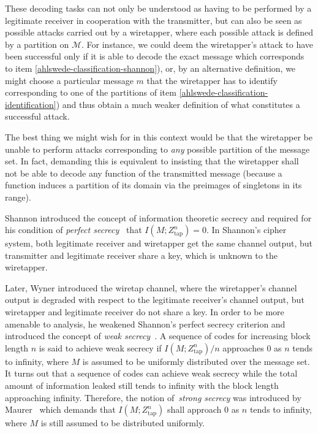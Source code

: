 \documentclass[journal]{IEEEtran}
\newcommand{\channelOut}{Z}
\newcommand{\channelOutWiretapper}{\channelOut_\mathrm{tap}}
\newcommand{\codebookBlocklength}{n}
\newcommand{\mutualInformation}[2]{I(#1;#2)}
\newcommand{\messageRV}{M}
\newcommand{\messageAlphabet}{\mathcal{M}}
\newcommand{\messageAlphabetElement}{m}
\begin{document}
These decoding tasks can not only be understood as having to be performed by a legitimate receiver in cooperation with the transmitter, but can also be seen as possible attacks carried out by a wiretapper, where each possible attack is defined by a partition on $\messageAlphabet$. For instance, we could deem the wiretapper's attack to have been successful only if it is able to decode the exact message which corresponds to item \ref{ahlswede-classification-shannon}), or, by an alternative definition, we might choose a particular message $\messageAlphabetElement$ that the wiretapper has to identify corresponding to one of the partitions of item \ref{ahlswede-classification-identification}) and thus obtain a much weaker definition of what constitutes a successful attack. 

The best thing we might wish for in this context would be that the wiretapper be unable to perform attacks corresponding to \emph{any} possible partition of the message set. In fact, demanding this is equivalent to insisting that the wiretapper shall not be able to decode any function of the transmitted message (because a function induces a partition of its domain via the preimages of singletons in its range).
 
Shannon introduced the concept of information theoretic secrecy and required for his condition of \emph{perfect secrecy}~\cite{ShannonSecrecy} that $\mutualInformation{\messageRV}{\channelOutWiretapper^\codebookBlocklength} = 0$. In Shannon's cipher system, both legitimate receiver and wiretapper get the same channel output, but transmitter and legitimate receiver share a key, which is unknown to the wiretapper.

Later, Wyner introduced the wiretap channel, where the wiretapper's channel output is degraded with respect to the legitimate receiver's channel output, but wiretapper and legitimate receiver do not share a key. In order to be more amenable to analysis, he weakened Shannon's perfect secrecy criterion and introduced the concept of \emph{weak secrecy}~\cite{WynerWiretap}. A sequence of codes for increasing block length $\codebookBlocklength$ is said to achieve weak secrecy if $\mutualInformation{\messageRV}{\channelOutWiretapper^\codebookBlocklength}/\codebookBlocklength$ approaches $0$ as $\codebookBlocklength$ tends to infinity, where $\messageRV$ is assumed to be uniformly distributed over the message set. It turns out that a sequence of codes can achieve weak secrecy while the total amount of information leaked still tends to infinity with the block length approaching infinity. Therefore, the notion of~\emph{strong secrecy} was introduced by Maurer~\cite{MaurerStrongSecret} which demands that $\mutualInformation{\messageRV}{\channelOutWiretapper^\codebookBlocklength}$ shall approach $0$ as $\codebookBlocklength$ tends to infinity, where $\messageRV$ is still assumed to be distributed uniformly.
\end{document}
